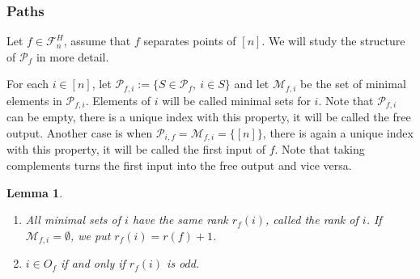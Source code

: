 \documentclass[12pt]{article}
\newtheorem{lemma}{Lemma}
\theoremstyle{definition}
\theoremstyle{remark}
\def\Pe{\mathcal P}
\def\Fe{\mathcal F}
\begin{document}
\subsubsection{Paths}

Let $f\in \Fe_n^H$, assume that $f$ separates points of $[n]$. 
We will study the structure of $\Pe_f$ in more detail.

For each $i\in [n]$, let $\Pe_{f,i}:=\{S\in \Pe_f,\ i\in S\}$ and let $\mathcal M_{f,i}$ be the
set of minimal elements in $\Pe_{f,i}$. Elements of $i$ will be called minimal sets for
$i$. Note that $\Pe_{f,i}$ can be empty, there is a unique index with this property, it
will be called the free output. 
Another case is when $\Pe_{i,f}=\mathcal M_{f,i}=\{[n]\}$, there is again a unique index with this
property, it will be called the first input of $f$. Note that taking complements turns the
first input into the free output and vice versa.


\begin{lemma}\label{lemma:points} 
\begin{enumerate}
\item[(i)]  All minimal sets of $i$ have the same rank $r_f(i)$, called the rank of $i$. If
$\mathcal M_{f,i}=\emptyset$, we put $r_f(i)=r(f)+1$. 
\item[(ii)] $i\in O_f$ if and only if $r_f(i)$ is odd.

\end{enumerate}


\end{lemma}
\end{document}

